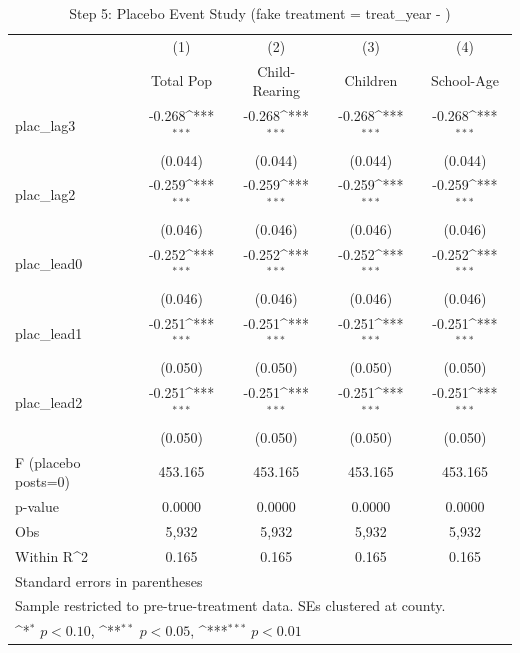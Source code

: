 \begin{table}[htbp]\centering
\def\sym#1{\ifmmode^{#1}\else\(^{#1}\)\fi}
\caption{Step 5: Placebo Event Study (fake treatment = treat\_year - )}
\begin{tabular}{l*{4}{c}}
\hline\hline
            &\multicolumn{1}{c}{(1)}&\multicolumn{1}{c}{(2)}&\multicolumn{1}{c}{(3)}&\multicolumn{1}{c}{(4)}\\
            &\multicolumn{1}{c}{Total Pop}&\multicolumn{1}{c}{Child-Rearing}&\multicolumn{1}{c}{Children}&\multicolumn{1}{c}{School-Age}\\
\hline
plac\_lag3   &      -0.268\sym{***}&      -0.268\sym{***}&      -0.268\sym{***}&      -0.268\sym{***}\\
            &     (0.044)         &     (0.044)         &     (0.044)         &     (0.044)         \\
[1em]
plac\_lag2   &      -0.259\sym{***}&      -0.259\sym{***}&      -0.259\sym{***}&      -0.259\sym{***}\\
            &     (0.046)         &     (0.046)         &     (0.046)         &     (0.046)         \\
[1em]
plac\_lead0  &      -0.252\sym{***}&      -0.252\sym{***}&      -0.252\sym{***}&      -0.252\sym{***}\\
            &     (0.046)         &     (0.046)         &     (0.046)         &     (0.046)         \\
[1em]
plac\_lead1  &      -0.251\sym{***}&      -0.251\sym{***}&      -0.251\sym{***}&      -0.251\sym{***}\\
            &     (0.050)         &     (0.050)         &     (0.050)         &     (0.050)         \\
[1em]
plac\_lead2  &      -0.251\sym{***}&      -0.251\sym{***}&      -0.251\sym{***}&      -0.251\sym{***}\\
            &     (0.050)         &     (0.050)         &     (0.050)         &     (0.050)         \\
\hline
F (placebo posts=0)&     453.165         &     453.165         &     453.165         &     453.165         \\
p-value     &      0.0000         &      0.0000         &      0.0000         &      0.0000         \\
Obs         &       5,932         &       5,932         &       5,932         &       5,932         \\
Within R^2  &       0.165         &       0.165         &       0.165         &       0.165         \\
\hline\hline
\multicolumn{5}{l}{\footnotesize Standard errors in parentheses}\\
\multicolumn{5}{l}{\footnotesize Sample restricted to pre-true-treatment data.  SEs clustered at county.}\\
\multicolumn{5}{l}{\footnotesize \sym{*} \(p<0.10\), \sym{**} \(p<0.05\), \sym{***} \(p<0.01\)}\\
\end{tabular}
\end{table}
